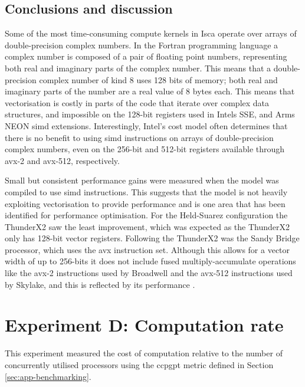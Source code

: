 \documentclass[a4paper,11pt]{report}
\begin{document}
\subsection{Conclusions and discussion}
Some of the most time-consuming compute kernels in Isca operate over arrays of double-precision complex numbers. In the Fortran programming language a complex number is composed of a pair of floating point numbers, representing both real and imaginary parts of the complex number. This means that a double-precision complex number of kind 8 uses 128 bits of memory; both real and imaginary parts of the number are a real value of 8 bytes each. This means that vectorisation is costly in parts of the code that iterate over complex data structures, and impossible on the 128-bit registers used in Intels SSE, and Arms NEON \gls{simd} extensions. Interestingly, Intel's cost model often determines that there is no benefit to using \gls{simd} instructions on arrays of double-precision complex numbers, even on the 256-bit and 512-bit registers available through \gls{avx}-2 and \gls{avx}-512, respectively.
\par
Small but consistent performance gains were measured when the model was compiled to use \gls{simd} instructions. This suggests that the model is not heavily exploiting vectorisation to provide performance and is one area that has been identified for performance optimisation. For the Held-Suarez configuration the ThunderX2 saw the least improvement, which was expected as the ThunderX2 only has 128-bit vector registers. Following the ThunderX2 was the Sandy Bridge processor, which uses the \gls{avx} instruction set. Although this allows for a vector width of up to 256-bits it does not include fused multiply-accumulate operations like the \gls{avx}-2 instructions used by Broadwell and the \gls{avx}-512 instructions used by Skylake, and this is reflected by its performance \cite{reinders2013intel, intel2017avx}.



\section{Experiment D: Computation rate}
This experiment measured the cost of computation relative to the number of concurrently utilised processors using the \gls{ccpgpt} metric defined in Section \ref{sec:app-benchmarking}. %
\label{sec:comm-analysis}
\end{document}
